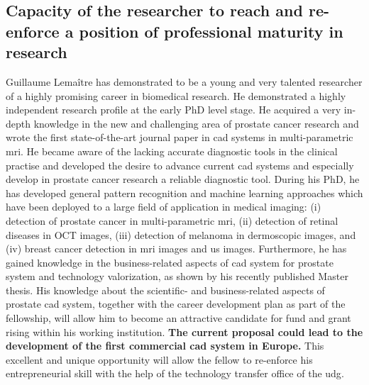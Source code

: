 \subsection{Capacity of the researcher to reach and re-enforce a position of professional maturity in research}
\label{sec:maturity}

Guillaume Lema\^itre has demonstrated to be a young and very talented researcher of a highly promising career in biomedical research. He demonstrated a highly independent research profile at the early PhD level stage. 
He acquired a very in-depth knowledge in the new and challenging area of prostate cancer research and wrote the first state-of-the-art journal paper in \ac{cad} systems in multi-parametric \ac{mri}.
He became aware of the lacking accurate diagnostic tools in the clinical practise and developed the desire to advance current \ac{cad} systems and especially develop in prostate cancer research a reliable diagnostic tool. 
During his PhD, he has developed general pattern recognition and machine learning approaches which have been deployed to a large field of application in medical imaging: (i) detection of prostate cancer in multi-parametric \ac{mri}, (ii) detection of retinal diseases in OCT images, (iii) detection of melanoma in dermoscopic images, and (iv) breast cancer detection in \ac{mri} images and \ac{us} images. 
Furthermore, he has gained knowledge in the business-related aspects of \ac{cad} system for prostate system and technology valorization, as shown by his recently published Master thesis.
His knowledge about the scientific- and business-related aspects of prostate \ac{cad} system, together with the career development plan as part of the fellowship, will allow him to become an attractive candidate for fund and grant rising within his working institution.
\textbf{The current proposal could lead to the development of the first commercial \ac{cad} system in Europe.}
This excellent and unique opportunity will allow the fellow to re-enforce his entrepreneurial skill with the help of the technology transfer office of the \ac{udg}. 